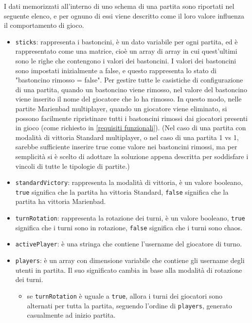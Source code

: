 I dati memorizzati all'interno di uno schema di una partita sono riportati nel seguente elenco, e per ognuno di essi viene descritto come il loro valore influenza il comportamento di gioco.
\begin{itemize}
\item
	\texttt{sticks}: rappresenta i bastoncini, è un dato variabile per ogni partita, ed è rappresentato come una matrice, cioè un array di array in cui quest'ultimi sono le righe che contengono i valori dei bastoncini.
	\newline
	I valori dei bastoncini sono impostati inizialmente a false, e questo rappresenta lo stato di "bastoncino rimosso = false". Per gestire tutte le casistiche di configurazione di una partita, quando un bastoncino viene rimosso, nel valore del bastoncino viene inserito il nome del giocatore che lo ha rimosso. In questo modo, nelle partite Marienbad multiplayer, quando un giocatore viene eliminato, si possono facilmente ripristinare tutti i bastoncini rimossi dai giocatori presenti in gioco (come richiesto in \ref{requisiti funzionali}).
	\newline
	(Nel caso di una partita con modalità di vittoria Standard multiplayer, o nel caso di una partita 1 vs 1, sarebbe sufficiente inserire true come valore nei bastoncini rimossi, ma per semplicità si è scelto di adottare la soluzione appena descritta per soddisfare i vincoli di tutte le tipologie di partite.)
\item
	\texttt{standardVictory}: rappresenta la modalità di vittoria, è un valore booleano, \texttt{true} significa che la partita ha vittoria Standard, \texttt{false} significa che la partita ha vittoria Marienbad.
\item
	\texttt{turnRotation}: rappresenta la rotazione dei turni, è un valore booleano, \texttt{true} significa che i turni sono in rotazione, \texttt{false} significa che i turni sono chaos.
\item
	\texttt{activePlayer}: è una stringa che contiene l'username del giocatore di turno.
\item
	\texttt{players}: è un array con dimensione variabile che contiene gli username degli utenti in partita.
	\newline
	Il suo significato cambia in base alla modalità di rotazione dei turni.
	\begin{itemize}
	\item
		se \texttt{turnRotation} è uguale a \texttt{true}, allora i turni dei giocatori sono alternati per tutta la partita, seguendo l'ordine di \texttt{players}, generato casualmente ad inizio partita.

\end{itemize}
\end{itemize}
